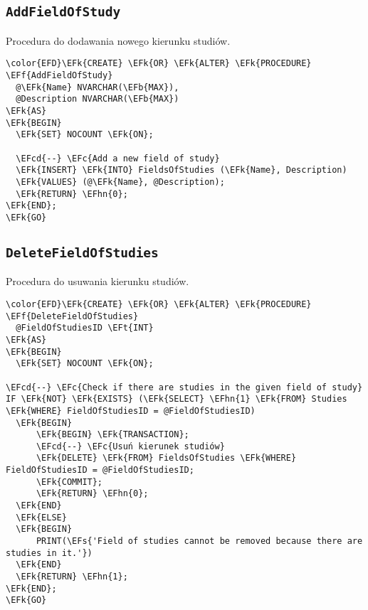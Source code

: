 \documentclass[11pt]{article}
\newcommand{\EFc}[1]{\textcolor{EFc}{\textit{#1}}} %
\newcommand{\EFcd}[1]{\textcolor{EFcd}{\textit{#1}}} %
\newcommand{\EFs}[1]{\textcolor{EFs}{#1}} %
\newcommand{\EFk}[1]{\textcolor{EFk}{\textbf{#1}}} %
\newcommand{\EFb}[1]{\textcolor{EFb}{\textbf{#1}}} %
\newcommand{\EFf}[1]{\textcolor{EFf}{#1}} %
\newcommand{\EFt}[1]{\textcolor{EFt}{\textbf{#1}}} %
\newcommand{\EFhn}[1]{\textcolor{EFhn}{#1}} %
\begin{document}
\subsection{\texttt{AddFieldOfStudy}}
\label{sec:orgd12cf52}
Procedura do dodawania nowego kierunku studiów.
\begin{Code}
\begin{Verbatim}
\color{EFD}\EFk{CREATE} \EFk{OR} \EFk{ALTER} \EFk{PROCEDURE} \EFf{AddFieldOfStudy}
  @\EFk{Name} NVARCHAR(\EFb{MAX}),
  @Description NVARCHAR(\EFb{MAX})
\EFk{AS}
\EFk{BEGIN}
  \EFk{SET} NOCOUNT \EFk{ON};

  \EFcd{--} \EFc{Add a new field of study}
  \EFk{INSERT} \EFk{INTO} FieldsOfStudies (\EFk{Name}, Description)
  \EFk{VALUES} (@\EFk{Name}, @Description);
  \EFk{RETURN} \EFhn{0};
\EFk{END};
\EFk{GO}
\end{Verbatim}
\end{Code}
\subsection{\texttt{DeleteFieldOfStudies}}
\label{sec:org43654b2}
Procedura do usuwania kierunku studiów.
\begin{Code}
\begin{Verbatim}
\color{EFD}\EFk{CREATE} \EFk{OR} \EFk{ALTER} \EFk{PROCEDURE} \EFf{DeleteFieldOfStudies}
  @FieldOfStudiesID \EFt{INT}
\EFk{AS}
\EFk{BEGIN}
  \EFk{SET} NOCOUNT \EFk{ON};

\EFcd{--} \EFc{Check if there are studies in the given field of study}
IF \EFk{NOT} \EFk{EXISTS} (\EFk{SELECT} \EFhn{1} \EFk{FROM} Studies \EFk{WHERE} FieldOfStudiesID = @FieldOfStudiesID)
  \EFk{BEGIN}
      \EFk{BEGIN} \EFk{TRANSACTION};
      \EFcd{--} \EFc{Usuń kierunek studiów}
      \EFk{DELETE} \EFk{FROM} FieldsOfStudies \EFk{WHERE} FieldOfStudiesID = @FieldOfStudiesID;
      \EFk{COMMIT};
      \EFk{RETURN} \EFhn{0};
  \EFk{END}
  \EFk{ELSE}
  \EFk{BEGIN}
      PRINT(\EFs{'Field of studies cannot be removed because there are studies in it.'})
  \EFk{END}
  \EFk{RETURN} \EFhn{1};
\EFk{END};
\EFk{GO}
\end{Verbatim}
\end{Code}
\end{document}
